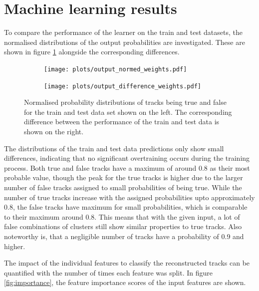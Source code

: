 \section{Machine learning results}
To compare the performance of the learner on the train and test datasets, the normalised distributions of the output probabilities are investigated.
These are shown in figure \ref{fig:output} alongside the corresponding differences.

\begin{figure}
  \hspace{-0.45cm}
  \begin{subfigure}{0.51\textwidth}
      \centering
      \texttt{[image: plots/output\_normed\_weights.pdf]}
  \end{subfigure}
  \begin{subfigure}{0.51\textwidth}
      \hspace{-0.15cm}
      \texttt{[image: plots/output\_difference\_weights.pdf]}
  \end{subfigure}
  \caption{Normalised probability distributions of tracks being true and false for the train and test data set shown on the left.
  The corresponding difference between the performance of the train and test data is shown on the right.}
  \label{fig:output}
\end{figure}

The distributions of the train and test data predictions only show small differences, indicating that no significant overtraining occurs during the training process.
Both true and false tracks have a maximum of around 0.8 as their most probable value, though the peak for the true tracks is higher due to the larger number
of false tracks assigned to small probabilities of being true. While the number of true tracks increase with the assigned probabilities upto
approximately 0.8, the false tracks have maximum for small probabilities, which is comparable to their maximum around 0.8.
This means that
with the given input, a lot of false combinations of clusters still show similar properties to true tracks.
Also noteworthy is, that a negligible number of tracks have a probability of 0.9 and higher.

The impact of the individual features to classify the reconstructed tracks can be quantified with the number of times each feature was split.
In figure \ref{fig:importance}, the feature importance scores of the input features are shown.

